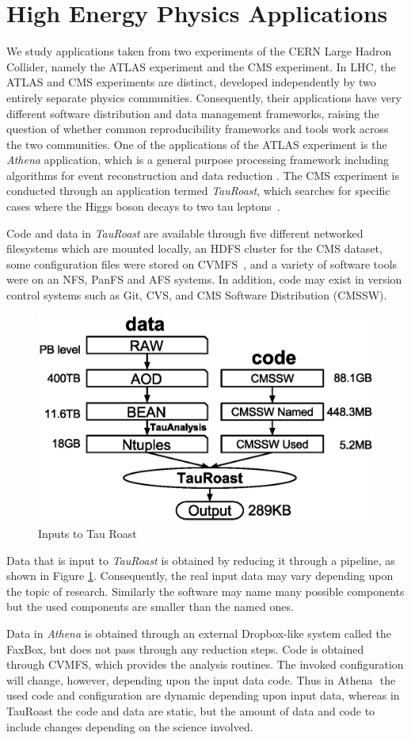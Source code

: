 \section{High Energy Physics Applications}

We study applications taken from two experiments of the CERN Large Hadron Collider, namely the ATLAS experiment and the CMS experiment. 
In LHC, the ATLAS and CMS experiments are distinct, 
developed independently by two entirely separate physics communities. Consequently, their applications  
have very different software distribution and data management frameworks, raising the question of whether common reproducibility frameworks and tools work across the two communities.  
One of the applications of the ATLAS experiment is the \emph{Athena} application, which is a general purpose processing framework including algorithms
for event reconstruction and data reduction \cite{calafiura2005athena}. The CMS experiment is conducted through an application termed  \emph{TauRoast}, which searches for specific 
cases where the Higgs boson decays to two tau leptons~\cite{chatrchyan2013search}. 

Code and data in \emph{TauRoast} are available through five different networked filesystems which are mounted locally, an HDFS cluster for the CMS dataset, 
some configuration files were stored on CVMFS~\cite{blomer2011cernvm}, and a variety of software tools were on an NFS, PanFS and AFS systems.
In addition, code may exist in version control systems such as Git, CVS, and CMS Software Distribution (CMSSW). %

\begin{figure}
\small
\centering
\includegraphics[width=.4\textwidth]{data-code-size.eps}
\caption{Inputs to Tau Roast}
\label{fig:data-code-size}
\end{figure}

Data that is input to \emph{TauRoast} is obtained by reducing it through a pipeline, as shown in Figure \ref{fig:data-code-size}. Consequently, the real input data may 
vary depending upon the topic of research. Similarly the software may name many possible components but the used components are
smaller than the named ones. 

Data in \emph{Athena} is obtained through an external Dropbox-like system called the FaxBox, but does not pass through any reduction steps. Code is obtained through 
CVMFS, which provides the analysis routines. 
The invoked configuration will change, however, depending upon the input data code.  Thus in Athena  the used code and configuration are dynamic depending upon input data, whereas in TauRoast the code and data are static, but the amount of data and code to include changes depending on the science involved.

